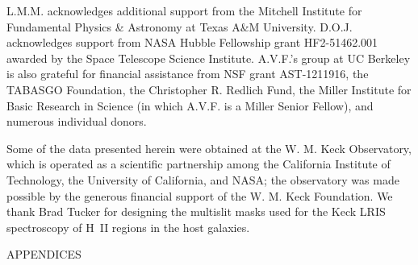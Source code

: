 \documentclass[12pt]{aastex631}
\begin{document}
L.M.M. acknowledges additional support from the Mitchell Institute for Fundamental Physics \& Astronomy at Texas A\&M University. D.O.J. acknowledges support from NASA Hubble Fellowship grant HF2-51462.001 awarded by the Space Telescope Science Institute. A.V.F.'s group at UC Berkeley is also grateful for financial assistance from NSF grant AST-1211916, the TABASGO Foundation, the Christopher R. Redlich Fund, the Miller Institute for Basic Research in Science (in which A.V.F. is a Miller Senior Fellow), and numerous individual donors.

Some of the data presented herein were obtained at the W. M. Keck Observatory, which is operated as a scientific partnership among the California Institute of Technology, the University of California, and NASA; the observatory was made possible by the generous financial support of the W. M. Keck Foundation. We thank Brad Tucker for designing the multislit masks used for the Keck LRIS spectroscopy of H~II regions in the host galaxies.

\clearpage

\begin{center}
APPENDICES    
\end{center}
\end{document}
